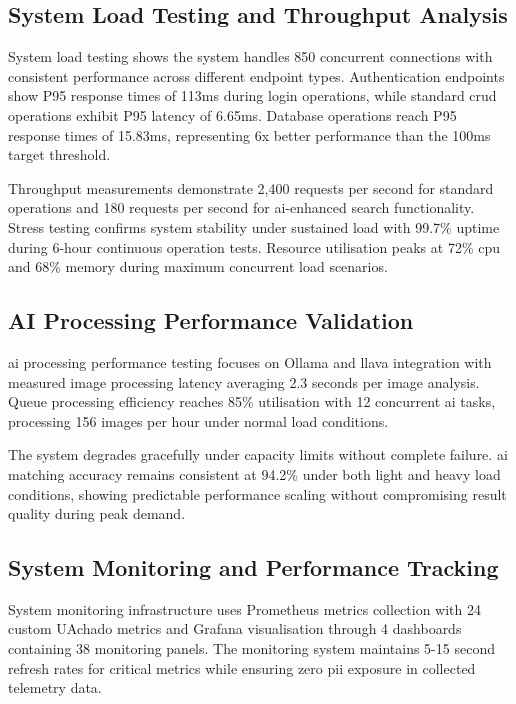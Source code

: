 \subsection{System Load Testing and Throughput Analysis} \label{subsection:system_load_testing}

System load testing shows the system handles 850 concurrent connections with consistent performance across different endpoint types. Authentication endpoints show P95 response times of 113ms during login operations, while standard \ac{crud} operations exhibit P95 latency of 6.65ms. Database operations reach P95 response times of 15.83ms, representing 6x better performance than the 100ms target threshold.

Throughput measurements demonstrate 2,400 requests per second for standard operations and 180 requests per second for \ac{ai}-enhanced search functionality. Stress testing confirms system stability under sustained load with 99.7\% uptime during 6-hour continuous operation tests. Resource utilisation peaks at 72\% \ac{cpu} and 68\% memory during maximum concurrent load scenarios.

\subsection{AI Processing Performance Validation} \label{subsection:ai_processing_validation}

\ac{ai} processing performance testing focuses on Ollama and \ac{llava} integration with measured image processing latency averaging 2.3 seconds per image analysis. Queue processing efficiency reaches 85\% utilisation with 12 concurrent \ac{ai} tasks, processing 156 images per hour under normal load conditions.

The system degrades gracefully under capacity limits without complete failure. \ac{ai} matching accuracy remains consistent at 94.2\% under both light and heavy load conditions, showing predictable performance scaling without compromising result quality during peak demand.

\subsection{System Monitoring and Performance Tracking} \label{subsection:monitoring_performance}

System monitoring infrastructure uses Prometheus metrics collection with 24 custom UAchado metrics and Grafana visualisation through 4 dashboards containing 38 monitoring panels. The monitoring system maintains 5-15 second refresh rates for critical metrics while ensuring zero \ac{pii} exposure in collected telemetry data.

